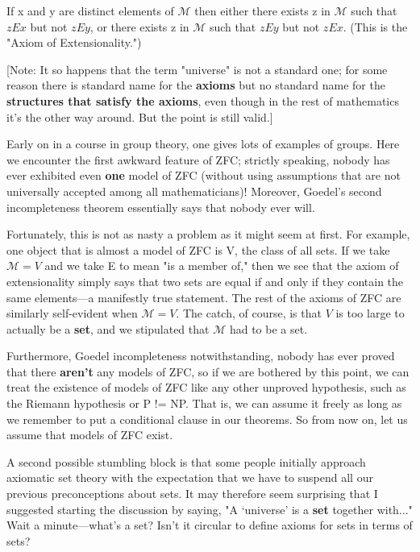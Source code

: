 \documentclass[10pt]{article}
\theoremstyle{definition}
\begin{document}
  If x and y are distinct elements of $\mathcal{M}$ then either there
  exists z in $\mathcal{M}$ such that $z E x$ but not $z E y$, or there
  exists z in $\mathcal{M}$ such that $z E y$ but not $z E x$.  (This is
  the "Axiom of Extensionality.")

[Note: It so happens that the term "universe" is not a standard one; for
some reason there is standard name for the \textbf{axioms} but no standard name for
the \textbf{structures that satisfy the axioms}, even though in the rest of
mathematics it's the other way around.  But the point is still valid.]

Early on in a course in group theory, one gives lots of examples of groups.
Here we encounter the first awkward feature of ZFC; strictly speaking,
nobody has ever exhibited even \textbf{one} model of ZFC (without using assumptions
that are not universally accepted among all mathematicians)!  Moreover,
Goedel's second incompleteness theorem essentially says that nobody ever
will.

Fortunately, this is not as nasty a problem as it might seem at first.  For
example, one object that is almost a model of ZFC is V, the class of all
sets.  If we take $\mathcal{M} = V$ and we take E to mean "is a member of," then we see
that the axiom of extensionality simply says that two sets are equal if and
only if they contain the same elements---a manifestly true statement.  The
rest of the axioms of ZFC are similarly self-evident when $\mathcal{M} = V$.  The catch,
of course, is that $V$ is too large to actually be a \textbf{set}, and we stipulated
that $\mathcal{M}$ had to be a set.

Furthermore, Goedel incompleteness notwithstanding, nobody has ever proved
that there \textbf{aren't} any models of ZFC, so if we are bothered by this point,
we can treat the existence of models of ZFC like any other unproved
hypothesis, such as the Riemann hypothesis or P != NP.  That is, we can
assume it freely as long as we remember to put a conditional clause in our
theorems.  So from now on, let us assume that models of ZFC exist.

A second possible stumbling block is that some people initially approach
axiomatic set theory with the expectation that we have to suspend all our
previous preconceptions about sets.  It may therefore seem surprising that
I suggested starting the discussion by saying, "A `universe' is a \textbf{set}
together with..."  Wait a minute---what's a set?  Isn't it circular to
define axioms for sets in terms of sets?
\end{document}
